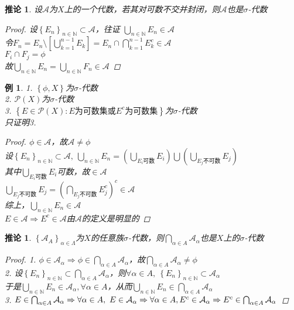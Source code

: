 \documentclass[12pt, a4paper, oneside]{ctexbook}
\newtheorem{corollary}[theorem]{推论}
\newtheorem{example}[theorem]{例}
\begin{document}
\begin{corollary}
    设$\mathcal{A}$为$X$上的一个代数，若其对可数不交并封闭，则$\mathcal{A}$也是$\sigma$-代数
    \begin{proof}
        设$\left\{E_n\right\}_{n\in\mathbb{N}}\subset\mathcal{A}$，往证 $\bigcup_{n\in\mathbb{N}}E_n\in\mathcal{A}$\\
        令$F_n=E_n\setminus[\bigcup_{k=1}^{n-1}E_k]=E_n\cap\bigcap_{k=1}^{n-1}E_k^c\in\mathcal{A}$\\
        $F_i\cap F_j=\phi$\\
        故$\bigcup_{n\in\mathbb{N}}E_n=\bigcup_{n\in\mathbb{N}}F_n\in\mathcal{A}$
    \end{proof}
\end{corollary}
\begin{example}
    1. $\left\{\phi,X\right\}$为$\sigma$-代数\\
    2. $\mathcal{P}(X)$为$\sigma$-代数\\
    3. $\left\{E\in\mathcal{P}(X):E\text{为可数集或}E^c\text{为可数集}\right\}$为$\sigma$-代数\\
    只证明3.
    \begin{proof}
        $\phi\in\mathcal{A}$，故$\mathcal{A}\neq\phi$\\
        设$\left\{E_n\right\}_{n\in\mathbb{N}}\subset\mathcal{A},\ \bigcup_{n\in\mathbb{N}}E_n=(\bigcup_{E_i\text{可数}}E_i)\bigcup(\bigcup_{E_j\text{不可数}}E_j)$\\
        其中$\bigcup_{E_i\text{可数}}E_i$可数，故$\in\mathcal{A}$\\
        $\bigcup_{E_j\text{不可数}}E_j=(\bigcap_{E_j\text{不可数}}E_j^c)^c\in\mathcal{A}$\\
        综上，$\bigcup_{n\in\mathbb{N}}E_n\in\mathcal{A}$\\
        $E\in\mathcal{A}\Rightarrow E^c\in\mathcal{A}$由$\mathcal{A}$的定义是明显的
    \end{proof}
\end{example}
\begin{corollary}
    $\left\{\mathcal{A}_A\right\}_{\alpha\in\Lambda}$为$X$的任意族$\sigma$-代数，则$\bigcap_{\alpha\in A}\mathcal{A}_{\alpha}$也是$X$上的$\sigma$-代数
    \begin{proof}
        1. $\phi\in\mathcal{A}_{\alpha}\Rightarrow\phi\in\bigcap_{\alpha\in A}\mathcal{A}_{\alpha}$，故$\bigcap_{\alpha\in A}\mathcal{A}_{\alpha}\neq\phi$\\
        2. 设$\left\{E_n\right\}_{n\in\mathbb{N}}\subset\bigcap_{\alpha\in A}\mathcal{A}_{\alpha}$，则$\forall \alpha\in A,\ \left\{E_n\right\}_{n\in \mathbb{N}}\subset\mathcal{A}_{\alpha}$\\
        于是$\bigcup_{n\in\mathbb{N}}E_n\in\mathcal{A}_{\alpha},\forall\alpha\in A$，从而$\bigcup_{n\in\mathbb{N}}E_n\in\bigcap_{\alpha\in A}\mathcal{A}_{\alpha}$\\
        3. $E\in\bigcap_{\alpha\in A}\mathcal{A}_{\alpha}\Rightarrow\forall\alpha\in A,\ E\in\mathcal{A}_{\alpha}\Rightarrow\forall\alpha\in A,E^c\in\mathcal{A}_{\alpha}\\
        \Rightarrow E^c\in\bigcap_{\alpha\in A}\mathcal{A}_{\alpha}$
    \end{proof}
\end{corollary}
\end{document}
